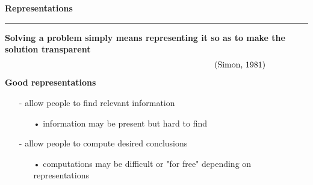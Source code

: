 \documentclass[pdf]{beamer}
\begin{document}

\begin{frame}
{\textbf{Representations}}{\textcolor{red}{\rule{12cm}{1.2pt}}}

{\textbf{\large Solving a problem simply means representing it so as to make the solution transparent }}
\begin{align*}
{\textrm{\qquad \qquad \qquad \qquad \qquad \qquad \qquad \qquad \qquad \qquad (Simon, 1981)}}
\end{align*}
\newline
\newline
\newline
{\textbf{\large Good representations \large}}
\begin{itemize}
\item[{-}] {allow people to find relevant information} 
\begin{itemize}
\item[{•}] {information may be present but hard to find}
\end{itemize}
\item[]
\item[{-}] {allow people to compute desired conclusions} 
\begin{itemize}
\item[{•}] {computations may be difficult or "for free" depending on representations} 
\end{itemize}
\end{itemize}
\end{frame}
\end{document}
